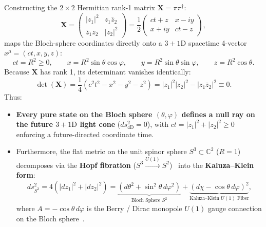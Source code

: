 \documentclass[11pt,a4paper]{article}
\begin{document}
Constructing the $2 \times 2$ Hermitian rank-1 matrix $\mathbf{X} = \pi \pi^\dagger$:
\begin{equation}
\mathbf{X} = \begin{pmatrix} |z_1|^2 & z_1 \bar{z}_2 \\ \bar{z}_1 z_2 & |z_2|^2 \end{pmatrix} = \frac{1}{2} \begin{pmatrix} ct + z & x - iy \\ x + iy & ct - z \end{pmatrix},
\end{equation}
maps the Bloch-sphere coordinates directly onto a $3+1\text{D}$ spacetime 4-vector $x^\mu = (ct, x, y, z)$:
\begin{equation}
ct = R^2 \ge 0, \qquad x = R^2 \sin\theta \cos\varphi, \qquad y = R^2 \sin\theta \sin\varphi, \qquad z = R^2 \cos\theta.
\end{equation}
Because $\mathbf{X}$ has rank 1, its determinant vanishes identically:
\begin{equation}
\det(\mathbf{X}) = \frac{1}{4}\left( c^2 t^2 - x^2 - y^2 - z^2 \right) = |z_1|^2 |z_2|^2 - |z_1 \bar{z}_2|^2 \equiv 0.
\end{equation}
Thus:
\begin{itemize}
    \item \textbf{Every pure state on the Bloch sphere $(\theta, \varphi)$ defines a null ray on the future $3+1\text{D}$ light cone} ($ds_{4\text{D}}^2 = 0$), with $ct = |z_1|^2 + |z_2|^2 \ge 0$ enforcing a future-directed coordinate time.
    \item Furthermore, the flat metric on the unit spinor sphere $S^3 \subset \mathbb{C}^2$ ($R=1$) decomposes via the \textbf{Hopf fibration} ($S^3 \xrightarrow{U(1)} S^2$)~\cite{Hopf1931} into the \textbf{Kaluza--Klein form}:
    \begin{equation}
    ds_{S^3}^2 = 4\left(|dz_1|^2 + |dz_2|^2\right) = \underbrace{\left( d\theta^2 + \sin^2\theta\, d\varphi^2 \right)}_{\text{Bloch Sphere } S^2} + \underbrace{\left( d\chi - \cos\theta\, d\varphi \right)^2}_{\text{Kaluza--Klein } U(1) \text{ Fiber}},
    \end{equation}
    where $A = -\cos\theta\, d\varphi$ is the Berry / Dirac monopole $U(1)$ gauge connection on the Bloch sphere~\cite{Dirac1931,Berry1984}.
\end{itemize}
\end{document}
